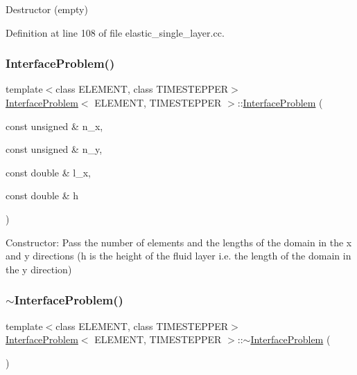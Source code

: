 Destructor (empty) 



Definition at line 108 of file elastic\+\_\+single\+\_\+layer.\+cc.

\mbox{\label{classInterfaceProblem_a83023535d663a2a6558959f36bf6e1e7}} 
\subsubsection{\texorpdfstring{Interface\+Problem()}{InterfaceProblem()}\hspace{0.1cm}{\footnotesize\ttfamily [2/2]}}
{\footnotesize\ttfamily template$<$class E\+L\+E\+M\+E\+NT, class T\+I\+M\+E\+S\+T\+E\+P\+P\+ER$>$ \\
\hyperlink{classInterfaceProblem}{Interface\+Problem}$<$ E\+L\+E\+M\+E\+NT, T\+I\+M\+E\+S\+T\+E\+P\+P\+ER $>$\+::\hyperlink{classInterfaceProblem}{Interface\+Problem} (\begin{DoxyParamCaption}\item[{const unsigned \&}]{n\+\_\+x,  }\item[{const unsigned \&}]{n\+\_\+y,  }\item[{const double \&}]{l\+\_\+x,  }\item[{const double \&}]{h }\end{DoxyParamCaption})}

Constructor\+: Pass the number of elements and the lengths of the domain in the x and y directions (h is the height of the fluid layer i.\+e. the length of the domain in the y direction) \mbox{\label{classInterfaceProblem_a90c191f8046069099b199743e7ce7111}} 
\subsubsection{\texorpdfstring{$\sim$\+Interface\+Problem()}{~InterfaceProblem()}\hspace{0.1cm}{\footnotesize\ttfamily [2/2]}}
{\footnotesize\ttfamily template$<$class E\+L\+E\+M\+E\+NT, class T\+I\+M\+E\+S\+T\+E\+P\+P\+ER$>$ \\
\hyperlink{classInterfaceProblem}{Interface\+Problem}$<$ E\+L\+E\+M\+E\+NT, T\+I\+M\+E\+S\+T\+E\+P\+P\+ER $>$\+::$\sim$\hyperlink{classInterfaceProblem}{Interface\+Problem} (\begin{DoxyParamCaption}{ }\end{DoxyParamCaption})\hspace{0.3cm}{\ttfamily [inline]}}




